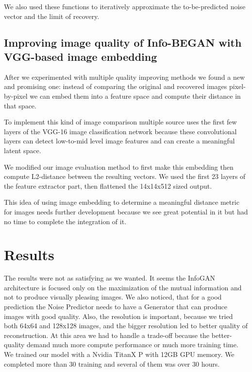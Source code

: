 \documentclass[10pt,journal,compsoc]{IEEEtran}
\begin{document}
We also used these functions to iteratively approximate the to-be-predicted noise vector and the limit of recovery.

\subsection{Improving image quality of Info-BEGAN with VGG-based image embedding}

After we experimented with multiple quality improving methods we found a new and promising one: instead of comparing the original and recovered images pixel-by-pixel we can embed them into a feature space and compute their distance in that space.

To implement this kind of image comparison multiple source \cite{abdal2019image2stylegan} uses the first few layers of the VGG-16 image classification network because these convolutional layers can detect low-to-mid level image features and can create a meaningful latent space.

We modified our image evaluation method to first make this embedding then compute L2-distance between the resulting vectors. We used the first 23 layers of the feature extractor part, then flattened the 14x14x512 sized output.

This idea of using image embedding to determine a meaningful distance metric for images needs further development because we see great potential in it but had no time to complete the integration of it.


\section{Results}
The results were not as satisfying as we wanted. It seems the InfoGAN architecture is focused only on the maximization of the mutual information and not to produce visually pleasing images. We also noticed, that for a good prediction the Noise Predictor needs to have a Generator that can produce images with good quality. Also, the resolution is important, because we tried both 64x64 and 128x128 images, and the bigger resolution led to better quality of reconstruction. At this area we had to handle a trade-off because the better-quality demand much more compute performance or much more training time. We trained our model with a Nvidia TitanX P with 12GB GPU memory. We completed more than 30 training and several of them was over 30 hours.
\end{document}
